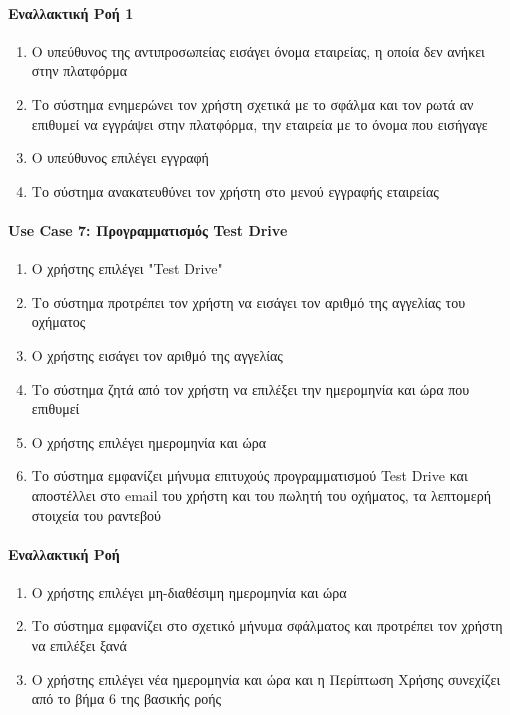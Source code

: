 \documentclass{../ol-softwaremanual}
\begin{document}
	\paragraph{Εναλλακτική Ροή 1}
	
	\begin{enumerate}
		\item Ο υπεύθυνος της αντιπροσωπείας εισάγει όνομα εταιρείας, η οποία δεν ανήκει στην πλατφόρμα
		\item Το σύστημα ενημερώνει τον χρήστη σχετικά με το σφάλμα και τον ρωτά αν επιθυμεί να εγγράψει στην πλατφόρμα, την εταιρεία με το όνομα που εισήγαγε
		\item Ο υπεύθυνος επιλέγει εγγραφή 
		\item Το σύστημα ανακατευθύνει τον χρήστη στο μενού εγγραφής εταιρείας
	\end{enumerate}
	
	\paragraph{\en Use Case 7: \gr Προγραμματισμός \en Test Drive \gr}
	
	\begin{enumerate}
		\item Ο χρήστης επιλέγει \en"Test Drive"\gr
		\item Το σύστημα προτρέπει τον χρήστη να εισάγει τον αριθμό της αγγελίας του οχήματος
		\item Ο χρήστης εισάγει τον αριθμό της αγγελίας
		\item Το σύστημα ζητά από τον χρήστη να επιλέξει την ημερομηνία και ώρα που επιθυμεί 
		\item Ο χρήστης επιλέγει ημερομηνία και ώρα
		\item Το σύστημα εμφανίζει μήνυμα επιτυχούς προγραμματισμού \en Test Drive \gr και αποστέλλει στο \en email \gr του χρήστη και του πωλητή του οχήματος, τα λεπτομερή στοιχεία του ραντεβού 
	\end{enumerate}
	
	\paragraph{Εναλλακτική Ροή}
	
	\begin{enumerate}
		\item Ο χρήστης επιλέγει μη-διαθέσιμη ημερομηνία και ώρα
		\item Το σύστημα εμφανίζει στο σχετικό μήνυμα σφάλματος και προτρέπει τον χρήστη να επιλέξει ξανά
		\item Ο χρήστης επιλέγει νέα ημερομηνία και ώρα και η Περίπτωση Χρήσης συνεχίζει από το βήμα 6 της βασικής ροής
	\end{enumerate}
	
\end{document}
